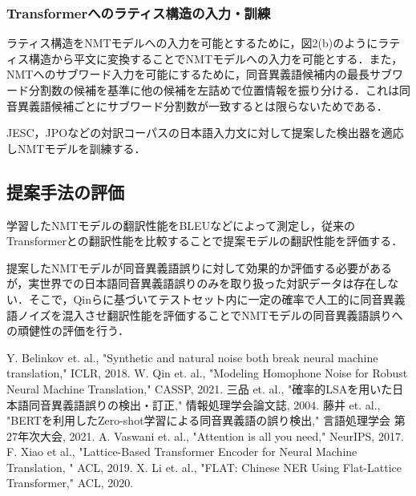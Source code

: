 \documentclass[a4j,10pt, twocolumn]{jarticle} \usepackage[dvipdfmx]{graphicx} \usepackage{amssymb} \usepackage{amsmath}
\begin{document}
\subsubsection{Transformerへのラティス構造の入力・訓練}
ラティス構造をNMTモデルへの入力を可能とするために，図2(b)のようにラティス構造から平文に変換することでNMTモデルへの入力を可能とする．また，NMTへのサブワード入力を可能にするために，同音異義語候補内の最長サブワード分割数の候補を基準に他の候補を左詰めで位置情報を振り分ける．これは同音異義語候補ごとにサブワード分割数が一致するとは限らないためである．

JESC，JPOなどの対訳コーパスの日本語入力文に対して提案した検出器を適応しNMTモデルを訓練する．

\subsection{提案手法の評価}
学習したNMTモデルの翻訳性能をBLEUなどによって測定し，従来のTransformerとの翻訳性能を比較することで提案モデルの翻訳性能を評価する．

提案したNMTモデルが同音異義語誤りに対して効果的か評価する必要があるが，実世界での日本語同音異義語誤りのみを取り扱った対訳データは存在しない．そこで，Qinら\cite{Qin}に基づいてテストセット内に一定の確率で人工的に同音異義語ノイズを混入させ翻訳性能を評価することでNMTモデルの同音異義語誤りへの頑健性の評価を行う．

\begin{thebibliography}{7}
{\footnotesize
\setlength{\itemsep}{-0.18mm}
Y. Belinkov et. al., "Synthetic and natural noise both break neural machine translation," ICLR, 2018.
W. Qin et. al., "Modeling Homophone Noise for Robust Neural Machine Translation," CASSP, 2021.
三品 et. al., "確率的LSAを用いた日本語同音異義語誤りの検出・訂正," 情報処理学会論文誌, 2004.
藤井 et. al., "BERTを利用したZero-shot学習による同音異義語の誤り検出," 言語処理学会 第27年次大会, 2021.
A. Vaswani et. al., "Attention is all you need," NeurIPS, 2017.
F. Xiao et al., "Lattice-Based Transformer Encoder for Neural Machine Translation, " ACL, 2019.
X. Li et. al., "FLAT: Chinese NER Using Flat-Lattice Transformer," ACL, 2020.
}
\end{thebibliography}
\end{document}
